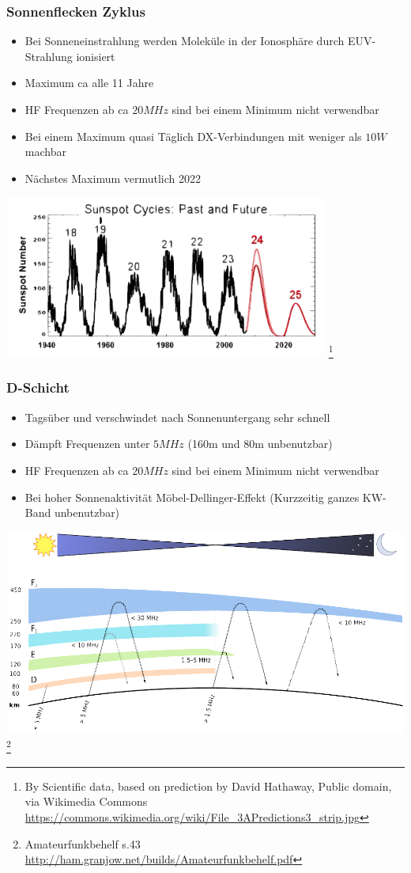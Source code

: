 \begin{frame}
    \frametitle{Sonnenflecken Zyklus}
    \begin{itemize}
    			\item Bei Sonneneinstrahlung werden Moleküle in der Ionosphäre durch EUV-Strahlung ionisiert
				\item Maximum ca alle 11 Jahre
       		 	\item HF Frequenzen ab ca $20MHz$ sind bei einem Minimum nicht verwendbar
       		 	\item Bei einem Maximum quasi Täglich DX-Verbindungen mit weniger als $10W$ machbar 
        		\item Nächstes Maximum vermutlich 2022
    \end{itemize}
	\begin{center}
        \includegraphics[width=0.8\textwidth]{e09/Predictions_sunspot.png}
        \footnote{\tiny By Scientific data, based on prediction by David Hathaway, Public domain, via Wikimedia Commons \url{https://commons.wikimedia.org/wiki/File_3APredictions3_strip.jpg}} %
    \end{center}
\end{frame}

\begin{frame}
    \frametitle{D-Schicht}
    \begin{itemize}
    			\item Tagsüber und verschwindet nach Sonnenuntergang sehr schnell
				\item Dämpft Frequenzen unter $5MHz$ (160m und 80m unbenutzbar)
       		 	\item HF Frequenzen ab ca $20MHz$ sind bei einem Minimum nicht verwendbar
       		 	\item Bei hoher Sonnenaktivität Möbel-Dellinger-Effekt (Kurzzeitig ganzes KW-Band unbenutzbar)
    \end{itemize}
    \begin{center}
        \includegraphics[width=.6\textwidth]{e09/schichten_behelf_43.png}
        \footnote{\tiny Amateurfunkbehelf s.43 \url{http://ham.granjow.net/builds/Amateurfunkbehelf.pdf}}
    \end{center}
\end{frame}

